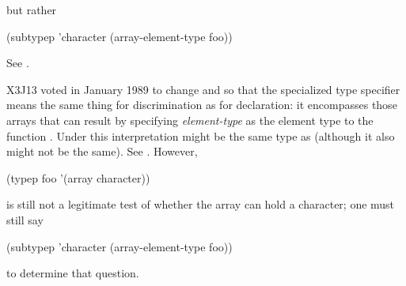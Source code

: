 \begin{flushdesc}
\begin{lisp}
\end{lisp}
but rather
\begin{lisp}
(subtypep 'character (array-element-type foo))
\end{lisp}
See .
\begin{new}
X3J13 voted in January 1989
to change  and 
so that the specialized  type specifier
means the same thing for discrimination
as for declaration: it encompasses those arrays
that can result by specifying \emph{element-type} as the element type
to the function .
Under this interpretation  might be
the same type as 
(although it also might not be the same).
See .
However,
\begin{lisp}
(typep foo '(array character))
\end{lisp}
is still not a legitimate test of whether the array
 can hold a character; one must still say
\begin{lisp}
(subtypep 'character (array-element-type foo))
\end{lisp}
to determine that question.


\end{new}
\end{flushdesc}
